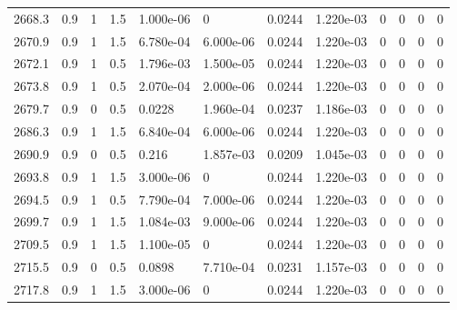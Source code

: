 \documentclass[preview]{standalone}
\begin{document}
{{{{{{{{{{{{{{{\begin{tabular}{L{1.2cm}C{1.2cm} C{0.3cm}C{0.5cm} C{1.4cm}C{1.4cm} C{1.4cm}C{1.4cm} C{1.6cm}C{1.6cm} C{1.6cm}C{1.6cm}}
  2668.3  &   0.9  & 1     & 1.5 &  1.000e-06  & 0  &  0.0244&   1.220e-03& 0 & 0   &  0 & 0  \\ 
  2670.9  &   0.9  & 1     & 1.5 &  6.780e-04  & 6.000e-06  &  0.0244&   1.220e-03& 0 & 0   &  0 & 0  \\ 
  2672.1  &   0.9  & 1     & 0.5 &  1.796e-03  & 1.500e-05  &  0.0244&   1.220e-03& 0 & 0   &  0 & 0  \\ 
  2673.8  &   0.9  & 1     & 0.5 &  2.070e-04  & 2.000e-06  &  0.0244&   1.220e-03& 0 & 0   &  0 & 0  \\ 
  2679.7  &   0.9  & 0     & 0.5 &  0.0228  & 1.960e-04  &  0.0237&   1.186e-03& 0 & 0   &  0 & 0  \\ 
  2686.3  &   0.9  & 1     & 1.5 &  6.840e-04  & 6.000e-06  &  0.0244&   1.220e-03& 0 & 0   &  0 & 0  \\ 
  2690.9  &   0.9  & 0     & 0.5 &  0.216  & 1.857e-03  &  0.0209&   1.045e-03& 0 & 0   &  0 & 0  \\ 
  2693.8  &   0.9  & 1     & 1.5 &  3.000e-06  & 0  &  0.0244&   1.220e-03& 0 & 0   &  0 & 0  \\ 
  2694.5  &   0.9  & 1     & 0.5 &  7.790e-04  & 7.000e-06  &  0.0244&   1.220e-03& 0 & 0   &  0 & 0  \\ 
  2699.7  &   0.9  & 1     & 1.5 &  1.084e-03  & 9.000e-06  &  0.0244&   1.220e-03& 0 & 0   &  0 & 0  \\ 
  2709.5  &   0.9  & 1     & 1.5 &  1.100e-05  & 0  &  0.0244&   1.220e-03& 0 & 0   &  0 & 0  \\ 
  2715.5  &   0.9  & 0     & 0.5 &  0.0898  & 7.710e-04  &  0.0231&   1.157e-03& 0 & 0   &  0 & 0  \\ 
  2717.8  &   0.9  & 1     & 1.5 &  3.000e-06  & 0  &  0.0244&   1.220e-03& 0 & 0   &  0 & 0  \\ 
\hline 
\end{tabular} 

}}}}}}}}}}}}}}}
\end{document}
